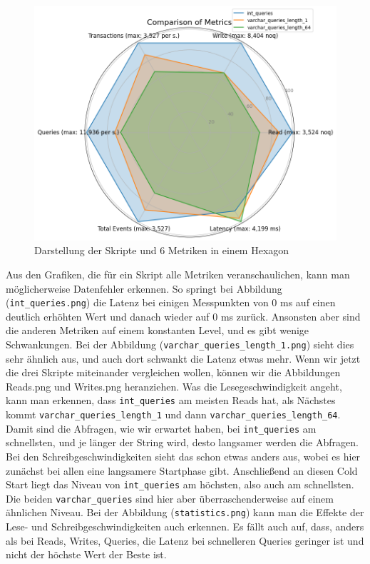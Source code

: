 \begin{figure}[!ht]
    \centering
    \includegraphics[width=.7\textwidth]{PNGs/Join_Type/statistics}
    \caption[Join-Typ: Hexagon-Diagramm]{Darstellung der Skripte und 6 Metriken in einem Hexagon}
    \label{fig:join-typ-hex}
\end{figure}

Aus den Grafiken, die für ein Skript alle Metriken veranschaulichen, kann man möglicherweise Datenfehler erkennen.
So springt bei Abbildung (\texttt{int\_queries.png}) die Latenz bei einigen Messpunkten von 0 ms auf einen deutlich erhöhten Wert und danach wieder auf 0 ms zurück.
Ansonsten aber sind die anderen Metriken auf einem konstanten Level, und es gibt wenige Schwankungen.
Bei der Abbildung (\texttt{varchar\_queries\_length\_1.png}) sieht dies sehr ähnlich aus, und auch dort schwankt die Latenz etwas mehr.
Wenn wir jetzt die drei Skripte miteinander vergleichen wollen, können wir die Abbildungen Reads.png und Writes.png heranziehen.
Was die Lesegeschwindigkeit angeht, kann man erkennen, dass \texttt{int\_queries} am meisten Reads hat, als Nächstes kommt \texttt{varchar\_queries\_length\_1} und dann \texttt{varchar\_queries\_length\_64}.
Damit sind die Abfragen, wie wir erwartet haben, bei \texttt{int\_queries} am schnellsten, und je länger der String wird, desto langsamer werden die Abfragen.
Bei den Schreibgeschwindigkeiten sieht das schon etwas anders aus, wobei es hier zunächst bei allen eine langsamere Startphase gibt.
Anschließend an diesen Cold Start liegt das Niveau von \texttt{int\_queries} am höchsten, also auch am schnellsten.
Die beiden \texttt{varchar\_queries} sind hier aber überraschenderweise auf einem ähnlichen Niveau.
Bei der Abbildung (\texttt{statistics.png}) kann man die Effekte der Lese- und Schreibgeschwindigkeiten auch erkennen.
Es fällt auch auf, dass, anders als bei Reads, Writes, Queries, die Latenz bei schnelleren Queries geringer ist und nicht der höchste Wert der Beste ist.